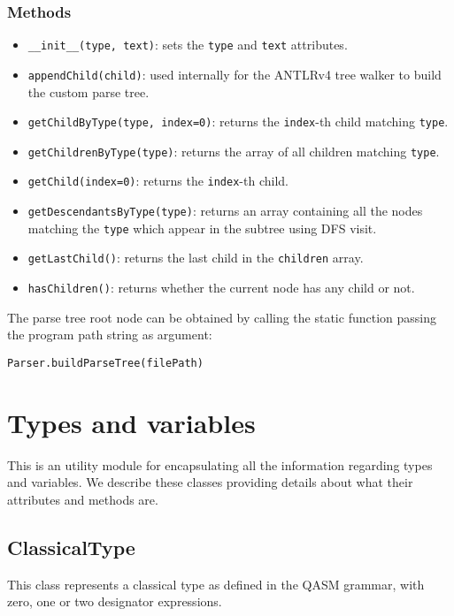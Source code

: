 \documentclass[12pt,a4paper]{report}
\theoremstyle{definition}
\theoremstyle{definition}
\theoremstyle{definition}
\begin{document}
\subsubsection{Methods}
\begin{itemize}
    \itemsep 0em
    \item \texttt{\_\_init\_\_(type, text)}: sets the \texttt{type} and \texttt{text} attributes.
    \item \texttt{appendChild(child)}: used internally for the ANTLRv4 tree walker to build the custom parse tree.
    \item \texttt{getChildByType(type, index=0)}: returns the \texttt{index}-th child matching \texttt{type}.
    \item \texttt{getChildrenByType(type)}: returns the array of all children matching \texttt{type}.
    \item \texttt{getChild(index=0)}: returns the \texttt{index}-th child.
    \item \texttt{getDescendantsByType(type)}: returns an array containing all the nodes matching the \texttt{type} which appear in the subtree using DFS visit.
    \item \texttt{getLastChild()}: returns the last child in the \texttt{children} array.
    \item \texttt{hasChildren()}: returns whether the current node has any child or not.
\end{itemize}
The parse tree root node can be obtained by calling the static function passing the program path string as argument:
\begin{lstlisting}
Parser.buildParseTree(filePath)
\end{lstlisting}


\section{Types and variables}
This is an utility module for encapsulating all the information regarding types and variables.
We describe these classes providing details about what their attributes and methods are.

\subsection{ClassicalType}
This class represents a classical type as defined in the QASM grammar, with zero, one or two designator expressions.
\end{document}
